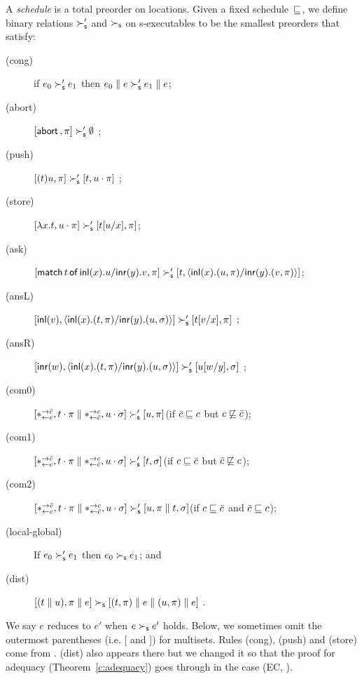 A \textit{schedule} is a total preorder on locations.
Given a fixed schedule~$\sqsubseteq$,
we define binary relations $\succ_{\mathsf s}'$ and $\succ_{\mathsf s}$
on s-executables
to be the smallest preorders
that satisfy:
\begin{description}
 \item[(cong)] if
      $e_0         \succ_{\mathsf s}' e_1$
      then
      $e_0 \parallel e \succ_{\mathsf s}' e_1\parallel e$\enspace;
 \item[(abort)] $[\mathsf{abort\,},\pi]\succ_{\mathsf s}' \emptyset$ \enspace;
 \item[(push)]
	    $[(t)u,\pi]      \succ_{\mathsf s}' [t,u\cdot\pi]$      \enspace;
 \item[(store)]
	    $[\lambda x.t,u\cdot\pi]
	     \succ_{\mathsf s}'
	     [t[u/x],      \pi]$\enspace;
 \item[(ask)]
      $[\mathsf{match}\,{t}\,\mathsf{of}\, \mathsf{inl}({x}). {u}/ \mathsf{inr}({y}). {v},\pi]\succ_{\mathsf s}' [t,\langle \mathsf{inl}({x}). ({u},{\pi})/ \mathsf{inr}({y}). ({v},{\pi})\rangle]$\enspace;
 \item[(ansL)]
           $[\mathsf{inl}({v}), \langle \mathsf{inl}({x}). ({t},{\pi})/ \mathsf{inr}({y}). ({u},{\sigma})\rangle] \succ_{\mathsf s}' [t[v/x],\pi] $ \enspace;
 \item[(ansR)]
           $[\mathsf{inr}({w}), \langle \mathsf{inl}({x}). ({t},{\pi})/ \mathsf{inr}({y}). ({u},{\sigma})\rangle] \succ_{\mathsf s}' [u[w/y],\sigma] $ \enspace;
 \item[(com0)]
           $[\ast^{\rightarrow {\bar{c}}}_{\leftarrow{c}}, t\cdot\pi\parallel \ast^{\rightarrow {c}}_{\leftarrow{\bar{c}}},
           u\cdot\sigma] \succ_{\mathsf s}'
           [u,\pi]$\enspace(if $\bar{c}\sqsubseteq c$ but $c\not\sqsubseteq \bar{c}$)\enspace;
 \item[(com1)]
	    $[\ast^{\rightarrow {\bar{c}}}_{\leftarrow{c}}, t\cdot\pi\parallel \ast^{\rightarrow {c}}_{\leftarrow{\bar{c}}},
	    u\cdot\sigma] \succ_{\mathsf s}'
	    [t,\sigma]$\enspace(if $c\sqsubseteq \bar{c}$ but $\bar{c}\not\sqsubseteq c$)\enspace;
 \item[(com2)]
	    $[\ast^{\rightarrow {\bar{c}}}_{\leftarrow{c}}, t\cdot\pi\parallel \ast^{\rightarrow {c}}_{\leftarrow{\bar{c}}},
	    u\cdot\sigma] \succ_{\mathsf s}'
	    [u,\pi\parallel t,\sigma]$\enspace(if $c\sqsubseteq \bar{c}$ and $\bar{c}\sqsubseteq
       c$)\enspace;
 \item[(local-global)] If $e_0\succ_{\mathsf s}'e_1$ then $e_0\succ_{\mathsf s} e_1$\enspace; and
 \item[(dist)]
           $[(t\parallel u),\pi\parallel e]  \succ_{\mathsf s} [(t,\pi)\parallel e\parallel (u,\pi)\parallel
      e]$ \enspace.
\end{description}
We say $e$ reduces to $e'$ when $e\succ_{\mathsf s} e'$ holds.
Below, we sometimes omit the outermost parentheses (i.e. [ and ]) for multisets.
Rules (cong), (push) and (store) come from
\citet{danos-krivine}.  (dist) also appears there but we changed it so
that the proof for adequacy (Theorem~\ref{c:adequacy}) goes through in the
case (EC, \textminus).


